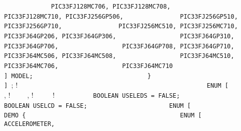 {{{{\lstinline!             PIC33FJ128MC706, PIC33FJ128MC708,  ! \newline
\lstinline!             PIC33FJ128MC710, PIC33FJ256GP506,  ! \newline
\lstinline!             PIC33FJ256GP510, PIC33FJ256GP710,  ! \newline
\lstinline!             PIC33FJ256MC510, PIC33FJ256MC710,  ! \newline
\lstinline!             PIC33FJ64GP206, PIC33FJ64GP306,    ! \newline
\lstinline!             PIC33FJ64GP310, PIC33FJ64GP706,    ! \newline
\lstinline!             PIC33FJ64GP708, PIC33FJ64GP710,    ! \newline
\lstinline!             PIC33FJ64MC506, PIC33FJ64MC508,    ! \newline
\lstinline!             PIC33FJ64MC510, PIC33FJ64MC706,    ! \newline
\lstinline!             PIC33FJ64MC710                     ! \newline
\lstinline!	   ] MODEL;                             ! \newline
\lstinline!	 }                                      ! \newline
\lstinline!      ] !;               ! \newline
\lstinline!                                             ! \newline
\lstinline!      ENUM [                                 ! \newline
\lstinline!	   !\quad \quad{},    ! \newline
\lstinline!	   !\quad \quad{}, ! \newline
\lstinline!	   !\quad \quad{} {    ! \newline
\lstinline!          BOOLEAN USELEDS = FALSE;           ! \newline
\lstinline!          BOOLEAN USELCD = FALSE;            ! \newline
\newline						
\lstinline!          ENUM [                             ! \newline
\lstinline!            DEMO {                           ! \newline
\lstinline!               ENUM [                        ! \newline
\lstinline!                ACCELEROMETER,               ! \newline
}}}}}
